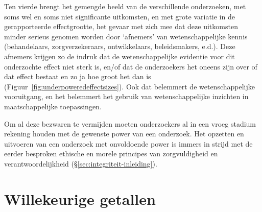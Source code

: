 \documentclass[
]{book}
\begin{document}
Ten vierde brengt het gemengde beeld van de verschillende onderzoeken,
met soms wel en soms niet significante uitkomsten, en met grote variatie
in de gerapporteerde effectgrootte, het gevaar met zich mee dat deze
uitkomsten minder serieus genomen worden door `afnemers' van
wetenschappelijke kennis (behandelaars, zorgverzekeraars, ontwikkelaars,
beleidsmakers, e.d.). Deze afnemers krijgen zo de indruk dat de
wetenschappelijke evidentie voor dit onderzochte effect niet sterk is,
en/of dat de onderzoekers het oneens zijn over of dat effect bestaat en
zo ja hoe groot het dan is \citep{Kolf93} (Figuur~\ref{fig:underpoweredeffectsizes}).
Ook dat belemmert de
wetenschappelijke vooruitgang, en het belemmert het gebruik van
wetenschappelijke inzichten in maatschappelijke toepassingen.

Om al deze bezwaren te vermijden moeten onderzoekers al in een vroeg
stadium rekening houden met de gewenste power van een onderzoek. Het
opzetten en uitvoeren van een onderzoek met onvoldoende power is immers
in strijd met de eerder besproken ethische en morele principes van
zorgvuldigheid en verantwoordelijkheid
(§\ref{sec:integriteit-inleiding}).

\hypertarget{appendix-appendices}{%
\appendix}


\hypertarget{app:randomgetallen}{%
\chapter{Willekeurige getallen}\label{app:randomgetallen}}
\end{document}
